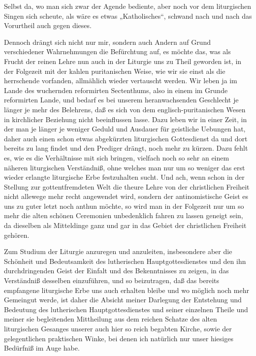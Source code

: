Selbst da, wo man sich zwar der Agende bediente, aber noch vor dem liturgischen Singen sich scheute, als wäre es etwas „Katholisches“, schwand nach und nach das Vorurtheil auch gegen dieses.

Dennoch drängt sich nicht nur mir, sondern auch Andern auf Grund verschiedener Wahrnehmungen die Befürchtung auf, es möchte das, was als Frucht der reinen Lehre nun auch in der Liturgie uns zu Theil geworden ist, in der Folgezeit mit der kahlen puritanischen Weise, wie wir sie einst als die herrschende vorfanden, allmählich wieder vertauscht werden. Wir leben ja im Lande des wuchernden reformirten Sectenthums, also in einem im Grunde reformirten Lande, und bedarf es bei unserem heranwachsenden Geschlecht je länger je mehr des Belehrens, daß es sich von dem englisch-puritanischen Wesen in kirchlicher Beziehung nicht beeinflussen lasse. Dazu leben wir in einer Zeit, in der man je länger je weniger Geduld und Ausdauer für geistliche Uebungen hat, daher auch einen schon etwas abgekürzten liturgischen Gottesdienst da und dort bereits zu lang findet und den Prediger drängt, noch mehr zu kürzen. Dazu fehlt es, wie es die Verhältnisse mit sich bringen, vielfach noch so sehr an einem näheren liturgischen Verständniß, ohne welches man nur um so weniger das erst wieder erlangte liturgische Erbe festzuhalten sucht. Und ach, wenn schon in der Stellung zur gottentfremdeten Welt die theure Lehre von der christlichen Freiheit nicht allewege mehr recht angewendet wird, sondern der antinomistische Geist es uns zu guter letzt noch anthun möchte, so wird man in der Folgezeit nur um so mehr die alten schönen Ceremonien unbedenklich fahren zu lassen geneigt sein, da dieselben als Mitteldinge ganz und gar in das Gebiet der christlichen Freiheit gehören.

Zum Studium der Liturgie anzuregen und anzuleiten, insbesondere aber die Schönheit und Bedeutsamkeit des lutherischen Hauptgottesdienstes und den ihn durchdringenden Geist der Einfalt und des Bekenntnisses zu zeigen, in das Verständniß desselben einzuführen, und so beizutragen, daß das bereits empfangene liturgische Erbe uns auch erhalten bleibe und wo möglich noch mehr Gemeingut werde, ist daher die Absicht meiner Darlegung der Entstehung und Bedeutung des lutherischen Hauptgottesdienstes und seiner einzelnen Theile und meiner sie begleitenden Mittheilung aus dem reichen Schatze des alten liturgischen Gesanges unserer auch hier so reich begabten Kirche, sowie der
gelegentlichen praktischen Winke, bei denen ich natürlich nur unser hiesiges Bedürfniß im Auge habe.

